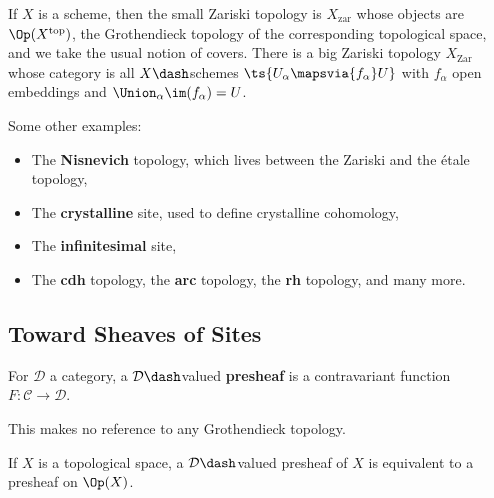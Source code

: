 \begin{example}[?]

If \(X\) is a scheme, then the small Zariski topology is
\(X_{\mathrm{zar}}\) whose objects are \(\Op(X^{\mathrm{top}})\), the
Grothendieck topology of the corresponding topological space, and we
take the usual notion of covers. There is a big Zariski topology
\(X_{\mathrm{Zar}}\) whose category is all \(X\dash\)schemes
\(\ts{U_\alpha\mapsvia{f_\alpha} U}\) with \(f_\alpha\) open embeddings
and \(\Union_\alpha \im(f_\alpha) = U\).

\end{example}

\begin{example}[?]

Some other examples:

\begin{itemize}
\item
  The \textbf{Nisnevich} topology, which lives between the Zariski and
  the étale topology,
\item
  The \textbf{crystalline} site, used to define crystalline cohomology,
\item
  The \textbf{infinitesimal} site,
\item
  The \textbf{cdh} topology, the \textbf{arc} topology, the \textbf{rh}
  topology, and many more.
\end{itemize}

\end{example}

\hypertarget{toward-sheaves-of-sites}{%
\subsection{Toward Sheaves of Sites}\label{toward-sheaves-of-sites}}

\begin{definition}[Presheaf]

For \(\mathcal{D}\) a category, a \(\mathcal{D}\dash\)valued
\textbf{presheaf} is a contravariant function
\(F:\mathcal{C}\to \mathcal{D}\).

\end{definition}

\begin{remark}

This makes no reference to any Grothendieck topology.

\end{remark}

\begin{example}[?]

If \(X\) is a topological space, a \(\mathcal{D}\dash\)valued presheaf
of \(X\) is equivalent to a presheaf on \(\Op(X)\).

\end{example}

